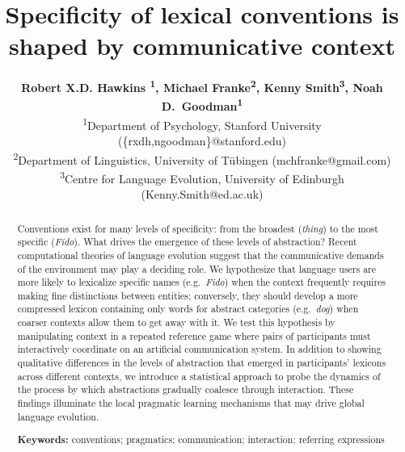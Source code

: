 \documentclass[10pt,letterpaper]{article}
\title{Specificity of lexical conventions is shaped by communicative context}
\author{{\large \bf Robert X.D. Hawkins \textsuperscript{1}, Michael Franke\textsuperscript{2}, Kenny Smith\textsuperscript{3}, Noah D.~Goodman\textsuperscript{1}} \\
   \textsuperscript{1}Department of Psychology, Stanford University (\{rxdh,ngoodman\}@stanford.edu) \\
  \textsuperscript{2}Department of Linguistics, University of T\"ubingen (mchfranke@gmail.com)\\
  \textsuperscript{3}Centre for Language Evolution, University of Edinburgh (Kenny.Smith@ed.ac.uk)}
\newcommand{\mf}[1]{\textcolor{Red}{[ndg: #1]}}
\begin{document}
\maketitle



\begin{abstract}
Conventions exist for many levels of specificity: from the broadest (\emph{thing}) to the most specific (\emph{Fido}). What drives the emergence of these levels of abstraction? Recent computational theories of language evolution suggest that the communicative demands of the environment may play a deciding role. We hypothesize that language users are more likely to lexicalize specific names (e.g.\ \emph{Fido}) when the context frequently requires making fine distinctions between entities; conversely, they should develop a more compressed lexicon containing only words for abstract categories (e.g.\ \emph{dog}) when coarser contexts allow them to get away with it. We test this hypothesis by manipulating context in a repeated reference game where pairs of participants must interactively coordinate on an artificial communication system. In addition to showing qualitative differences in the levels of abstraction that emerged in participants' lexicons across different contexts, we introduce a statistical approach to probe the dynamics of the process by which abstractions gradually coalesce through interaction. These findings illuminate the local pragmatic learning mechanisms that may drive global language evolution.

\textbf{Keywords:}
conventions; pragmatics; communication; interaction; referring expressions

\end{abstract}
\end{document}

